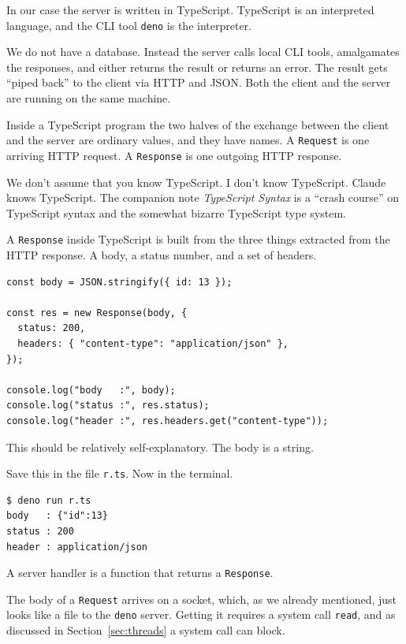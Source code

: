 \documentclass[11pt,a4paper]{article}
\begin{document}
In our case the server is written in TypeScript. TypeScript is an interpreted language, and the
CLI tool \texttt{deno} is the interpreter.

We do not have a database. Instead the server calls local CLI tools, amalgamates the responses,
and either returns the result or returns an error. The result gets ``piped back'' to the client
via HTTP and JSON. Both the client and the server are running on the same machine.

Inside a TypeScript program the two halves of the exchange between the client and the server are
ordinary values, and they have names. A \texttt{Request} is one arriving HTTP request. A
\texttt{Response} is one outgoing HTTP response.

\begin{sectionbox}
We don't assume that you know TypeScript. I don't know TypeScript. Claude knows TypeScript.
The companion note \emph{TypeScript Syntax} is a ``crash course'' on TypeScript syntax and the
somewhat bizarre TypeScript type system.
\end{sectionbox}

A \texttt{Response} inside TypeScript is built from the three things extracted from the HTTP
response. A body, a status number, and a set of headers.

\begin{lstlisting}[language=TS]
const body = JSON.stringify({ id: 13 });

const res = new Response(body, {
  status: 200,
  headers: { "content-type": "application/json" },
});

console.log("body   :", body);
console.log("status :", res.status);
console.log("header :", res.headers.get("content-type"));
\end{lstlisting}

This should be relatively self-explanatory. The body is a string.

Save this in the file \texttt{r.ts}. Now in the terminal.

\begin{lstlisting}[language=SH]
$ deno run r.ts
body   : {"id":13}
status : 200
header : application/json
\end{lstlisting}

A server handler is a function that returns a \texttt{Response}.

The body of a \texttt{Request} arrives on a socket, which, as we already mentioned, just looks
like a file to the \texttt{deno} server. Getting it requires a system call \texttt{read}, and as
discussed in Section~\ref{sec:threads} a system call can block.
\end{document}
